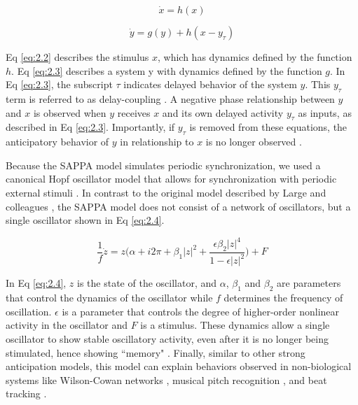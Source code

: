 \documentclass{report}
\begin{document}
\begin{equation}
\dot{x}=h(x) \label{eq:2.2}
\end{equation}

\begin{equation}
\dot{y}=g(y)+h(x-y_\tau) \label{eq:2.3}
\end{equation}

Eq \eqref{eq:2.2} describes the stimulus $x$, which has dynamics defined by the function $h$. Eq \eqref{eq:2.3} describes a system y with dynamics defined by the function $g$. In Eq \eqref{eq:2.3}, the subscript $\tau$ indicates delayed behavior of the system $y$. This $y_\tau$ term is referred to as delay-coupling \cite{boccaletti2001space, stepp2015muddle}. A negative phase relationship between $y$ and $x$ is observed when $y$ receives $x$ and its own delayed activity $y_\tau$ as inputs, as described in Eq \eqref{eq:2.3}. Importantly, if $y_\tau$ is removed from these equations, the anticipatory behavior of $y$ in relationship to $x$ is no longer observed \cite{stepp2015muddle}.

Because the SAPPA model simulates periodic synchronization, we used a canonical Hopf oscillator model that allows for synchronization with periodic external stimuli \cite{large2010canonical}. In contrast to the original model described by Large and colleagues \cite{large2010canonical}, the SAPPA model does not consist of a network of oscillators, but a single oscillator shown in Eq \eqref{eq:2.4}. 

\begin{equation}
\frac{1}{f}\dot{z} = z\bigg(\alpha + i2\pi + \beta_1|z|^2 + \frac{\epsilon\beta_2|z|^4}{1-\epsilon|z|^2}\bigg) + F \label{eq:2.4}
\end{equation}

In Eq \eqref{eq:2.4}, $z$ is the state of the oscillator, and $\alpha$, $\beta_1$ and $\beta_2$ are parameters that control the dynamics of the oscillator while $f$ determines the frequency of oscillation. $\epsilon$ is a parameter that controls the degree of higher-order nonlinear activity in the oscillator and $F$ is a stimulus. These dynamics allow a single oscillator to show stable oscillatory activity, even after it is no longer being stimulated, hence showing ``memory" \cite{kim2015signal}. Finally, similar to other strong anticipation models, this model can explain behaviors observed in non-biological systems like Wilson-Cowan networks \cite{large2010canonical}, musical pitch recognition \cite{large2010dynamical}, and beat tracking \cite{large2015neural}.
\end{document}
